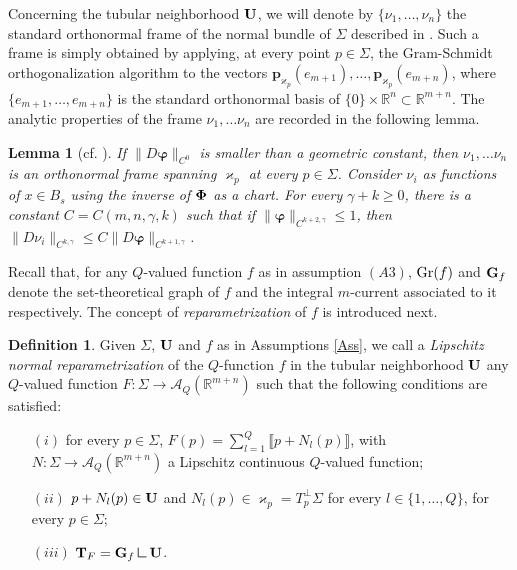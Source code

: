 \documentclass[a4paper,11pt,reqno]{amsart}
\newtheorem{lemma}[theorem]{Lemma}
\theoremstyle{definition}
\newtheorem{definition}[theorem]{Definition}
\numberwithin{equation}{section}
\numberwithin{subsection}{section}
\newcommand{\R}{\mathbb{R}}
\newcommand{\mres}{\mathbin{\vrule height 1.6ex depth 0pt width
0.13ex\vrule height 0.13ex depth 0pt width 1.3ex}}
\newcommand{\A}{\mathcal{A}}
\newcommand{\bphi}{\boldsymbol{\varphi}}
\newcommand{\p}{\mathbf{p}}
\begin{document}
Concerning the tubular neighborhood ${\bf U}$, we will denote by $\lbrace \nu_{1}, \dots, \nu_{n} \rbrace$ the standard orthonormal frame of the normal bundle of $\Sigma$ described in \cite[Appendix A]{DLS13a}. Such a frame is simply obtained by applying, at every point $p \in \Sigma$, the Gram-Schmidt orthogonalization algorithm to the vectors $\p_{\varkappa_p}(e_{m+1}), \dots, \p_{\varkappa_p}(e_{m+n})$, where $\lbrace e_{m+1}, \dots, e_{m+n} \rbrace$ is the standard orthonormal basis of $\{0\} \times \R^{n} \subset \R^{m+n}$. The analytic properties of the frame $\nu_{1}, \dots \nu_{n}$ are recorded in the following lemma.

\begin{lemma}[cf. {\cite[Lemma A.1]{DLS13a}}] \label{trivialization}
If $\| D \bphi \|_{C^0}$ is smaller than a geometric constant, then $\nu_{1}, \dots \nu_{n}$ is an orthonormal frame spanning $\varkappa_{p}$ at every $p \in \Sigma$. Consider $\nu_{i}$ as functions of $x \in B_{s}$ using the inverse of ${\bf \Phi}$ as a chart. For every $\gamma + k \geq 0$, there is a constant $C = C(m,n,\gamma,k)$ such that if $\| \bphi \|_{C^{k+2, \gamma}} \leq 1$, then $\| D \nu_{i} \|_{C^{k,\gamma}} \leq C \| D \bphi \|_{C^{k+1,\gamma}}$. 
\end{lemma}

Recall that, for any $Q$-valued function $f$ as in assumption $(A3)$, ${\rm Gr}(f)$ and ${\bf G}_{f}$ denote the set-theoretical graph of $f$ and the integral $m$-current associated to it respectively. The concept of \emph{reparametrization} of $f$ is introduced next.

\begin{definition} \label{reparametrization:def}
Given $\Sigma$, ${\bf U}$ and $f$ as in Assumptions \ref{Ass}, we call a \emph{Lipschitz normal reparametrization} of the $Q$-function $f$ in the tubular neighborhood ${\bf U}$ any $Q$-valued function $F \colon \Sigma \to \A_{Q}(\R^{m+n})$ such that the following conditions are satisfied:
\begin{itemize}
\item[$(i)$] for every $p \in \Sigma$, $F(p) = \sum_{l=1}^{Q} \llbracket p + N_{l}(p) \rrbracket$, with $N \colon \Sigma \to \A_{Q}(\R^{m+n})$ a Lipschitz continuous $Q$-valued function;
\item[$(ii)$] $p + N_{l}(p) \in {\bf U}$ and $N_{l}(p) \in \varkappa_{p} = T_{p}^{\perp}\Sigma$ for every $l \in \{1,\dots,Q\}$, for every $p \in \Sigma$;
\item[$(iii)$] ${\bf T}_{F} = {\bf G}_{f} \mres {\bf U}$.
\end{itemize} 
\end{definition}
\end{document}
